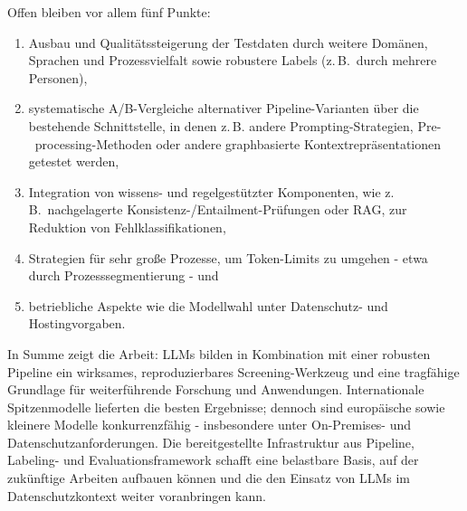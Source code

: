 Offen bleiben vor allem fünf Punkte:
\begin{enumerate}
    \item Ausbau und Qualitätssteigerung der Testdaten durch weitere Domänen, Sprachen und Prozessvielfalt sowie robustere Labels (z.\,B.\ durch mehrere Personen),
    \item systematische A/B-Vergleiche alternativer Pipeline-Varianten über die bestehende Schnittstelle, in denen z.\,B. andere Prompting-Strategien, Pre-\linebreak~processing-Methoden oder andere graphbasierte Kontextrepräsentationen getestet werden,
    \item Integration von wissens- und regelgestützter Komponenten, wie z.\,B.\ nachgelagerte Konsistenz-/Entailment-Prüfungen oder \ac{RAG}, zur Reduktion von Fehlklassifikationen,
    \item Strategien für sehr große Prozesse, um Token-Limits zu umgehen - etwa durch Prozesssegmentierung - und
    \item betriebliche Aspekte wie die Modellwahl unter Datenschutz- und Hostingvorgaben.
\end{enumerate}

In Summe zeigt die Arbeit: \acp{LLM} bilden in Kombination mit einer robusten Pipeline ein wirksames, reproduzierbares Screening-Werkzeug und eine tragfähige Grundlage für weiterführende Forschung und Anwendungen. Internationale Spitzenmodelle lieferten die besten Ergebnisse; dennoch sind europäische sowie kleinere Modelle konkurrenzfähig - insbesondere unter On-Premises- und Datenschutzanforderungen. Die bereitgestellte Infrastruktur aus Pipeline, Labeling- und Evaluationsframework schafft eine belastbare Basis, auf der zukünftige Arbeiten aufbauen können und die den Einsatz von \acp{LLM} im Datenschutzkontext weiter voranbringen kann.
